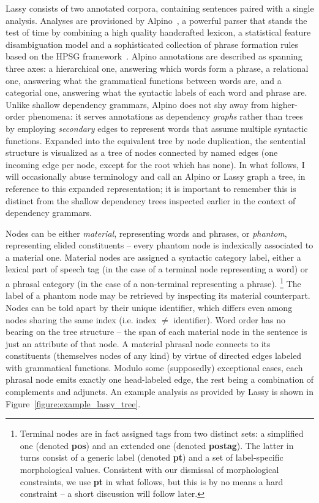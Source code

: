 Lassy consists of two annotated corpora, containing sentences paired with a single analysis.
Analyses are provisioned by Alpino~\cite{van2006last}, a powerful parser that stands the test of time by combining a high quality handcrafted lexicon, a statistical feature disambiguation model and a sophisticated collection of phrase formation rules based on the HPSG framework~\cite{pollard1994head}.
Alpino annotations are described as spanning three axes: a hierarchical one, answering which words form a phrase, a relational one, answering what the grammatical functions between words are, and a categorial one, answering what the syntactic labels of each word and phrase are.
Unlike shallow dependency grammars, Alpino does not shy away from higher-order phenomena: it serves annotations as dependency \textit{graphs} rather than trees by employing \textit{secondary} edges to represent words that assume multiple syntactic functions.
Expanded into the equivalent tree by node duplication, the sentential structure is visualized as a tree of nodes connected by named edges (one incoming edge per node, except for the root which has none).
In what follows, I will occasionally abuse terminology and call an Alpino or Lassy graph a tree, in reference to this expanded representation; it is important to remember this is distinct from the shallow dependency trees inspected earlier in the context of dependency grammars.

Nodes can be either \textit{material}, representing words and phrases, or \textit{phantom}, representing elided constituents -- every phantom node is indexically associated to a material one.
Material nodes are assigned a syntactic category label, either a lexical part of speech tag (in the case of a terminal node representing a word) or a phrasal category (in the case of a non-terminal representing a phrase).%
	\footnote{Terminal nodes are in fact assigned tags from two distinct sets: a simplified one (denoted \textbf{pos}) and an extended one (denoted \textbf{postag}). The latter in turns consist of a generic label (denoted \textbf{pt}) and a set of label-specific morphological values.
	Consistent with our dismissal of morphological constraints, we use \textbf{pt} in what follows, but this is by no means a hard constraint -- a short discussion will follow later.}
The label of a phantom node may be retrieved by inspecting its material counterpart.
Nodes can be told apart by their unique identifier, which differs even among nodes sharing the same index (i.e. index $\neq$ identifier).
Word order has no bearing on the tree structure -- the span of each material node in the sentence is just an attribute of that node.
A material phrasal node connects to its constituents (themselves nodes of any kind) by virtue of directed edges labeled with grammatical functions.
Modulo some (supposedly) exceptional cases, each phrasal node emits exactly one head-labeled edge, the rest being a combination of complements and adjuncts.
An example analysis as provided by Lassy is shown in Figure~\ref{figure:example_lassy_tree}.

